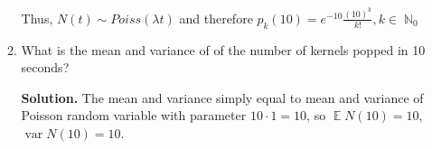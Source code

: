 \documentclass[a4paper, 12pt]{article}
\DeclareMathOperator{\N}{\mathbb{N}}
\DeclareMathOperator{\E}{\mathbb{E}}
\DeclareMathOperator{\var}{var}
\newcommand{\task}[2]{
    \item #1

    \textbf{Solution. } #2
}
\begin{document}
\begin{enumerate}
\begin{enumerate}
{                  Thus, $N(t) \sim Poiss(\lambda t)$ and therefore
                  $p_k(10) = e^{-10} \frac{(10)^k}{k!}, k \in \N_0$
              }
              \task{What is the mean and variance of of the number of kernels popped in 10 seconds?}
              {
                  The mean and variance simply equal to mean and variance of
                  Poisson random variable with parameter $10 \cdot 1 = 10$, so
                  $\E N(10) = 10$, $\var N(10) = 10$.
              }
          \end{enumerate}
\end{enumerate}
\end{document}
